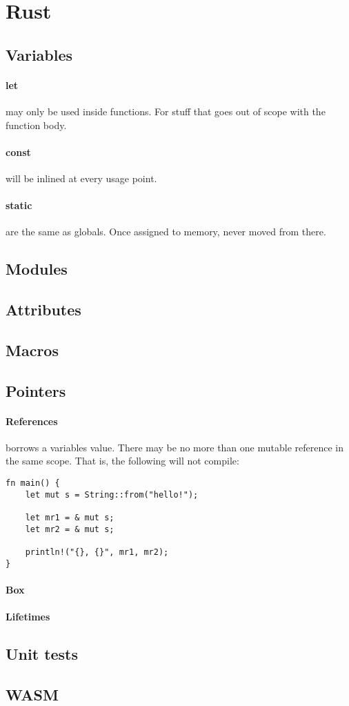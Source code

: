 \section{Rust}

\subsection{Variables}
\paragraph{let} may only be used inside functions. For stuff that goes out of scope with the function body.
\paragraph{const} will be inlined at every usage point.
\paragraph{static} are the same as globals. Once assigned to memory, never moved from there. 

\subsection{Modules}

\subsection{Attributes}

\subsection{Macros}

\subsection{Pointers}
\paragraph{References} \inlinecode{&} borrows a variables value. There may be no more than one mutable reference in the same scope. That is, the following will not compile:
\begin{lstlisting}[lang=rust]
fn main() {
    let mut s = String::from("hello!");

    let mr1 = & mut s;
    let mr2 = & mut s;

    println!("{}, {}", mr1, mr2);
}
\end{lstlisting}

\paragraph{Box}

\paragraph{Lifetimes}

\subsection{Unit tests}

\subsection{WASM}